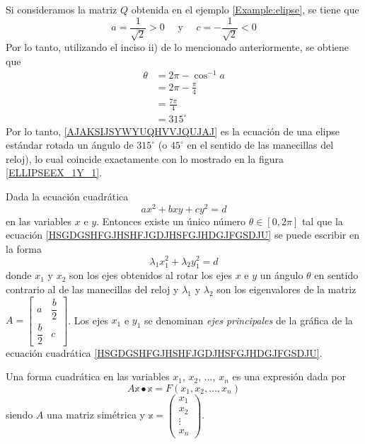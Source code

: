 \begin{example}
    Si consideramos la matriz $Q$ obtenida en el ejemplo \ref{Example:elipse}, se tiene que
    $$a = \frac{1}{\sqrt{2}} > 0 \quad \text{ y } \quad c = - \frac{1}{\sqrt{2}} < 0$$
    Por lo tanto, utilizando el inciso ii) de lo mencionado anteriormente, se obtiene que
    \begin{align*}
        \theta & = 2\pi - \cos^{-1} a \\
        & = 2\pi - \frac{\pi}{4} \\
        & = \frac{7\pi}{4} \\
        & = 315^{\circ}
    \end{align*}
    Por lo tanto, \eqref{AJAKSIJSYWYUQHVVJQUJAJ} es la ecuación de una elipse estándar rotada un ángulo de $315^{\circ}$ (o $45^{\circ}$ en el sentido de las manecillas del reloj), lo cual coincide exactamente con lo mostrado en la figura \ref{ELLIPSEEX_1Y_1}.
\end{example}

\newpage

\begin{theorem}
    Dada la ecuación cuadrática
    \begin{equation}
        ax^2 + bxy + cy^2 = d \label{HSGDGSHFGJHSHFJGDJHSFGJHDGJFGSDJU}
    \end{equation}
    en las variables $x$ e $y$. Entonces existe un único número $\theta \in [0, 2\pi]$ tal que la ecuación \eqref{HSGDGSHFGJHSHFJGDJHSFGJHDGJFGSDJU} se puede escribir en la forma
    $$\lambda_1 x_1^2 + \lambda_2 y_1^2 = d$$
    donde $x_1$ y $x_2$ son los ejes obtenidos al rotar los ejes $x$ e $y$ un ángulo $\theta$ en sentido contrario al de las manecillas del reloj y $\lambda_1$ y $\lambda_2$ son los eigenvalores de la matriz $A = \begin{bmatrix}
        a & \dfrac{b}{2} \\[2mm]
        \dfrac{b}{2} & c
    \end{bmatrix}$. Los ejes $x_1$ e $y_1$ se denominan \emph{ejes principales} de la gráfica de la ecuación cuadrática \eqref{HSGDGSHFGJHSHFJGDJHSFGJHDGJFGSDJU}.
\end{theorem}

\begin{definition}
    Una forma cuadrática en las variables $x_1$, $x_2$, $\dots$, $x_n$ es una expresión dada por
    $$A\mathbb{x} \bullet \mathbb{x} = F(x_1, x_2, \dots, x_n)$$
    siendo $A$ una matriz simétrica y $\mathbb{x} = \begin{pmatrix} x_1 \\ x_2 \\ \vdots \\ x_n \end{pmatrix}$.
\end{definition}

